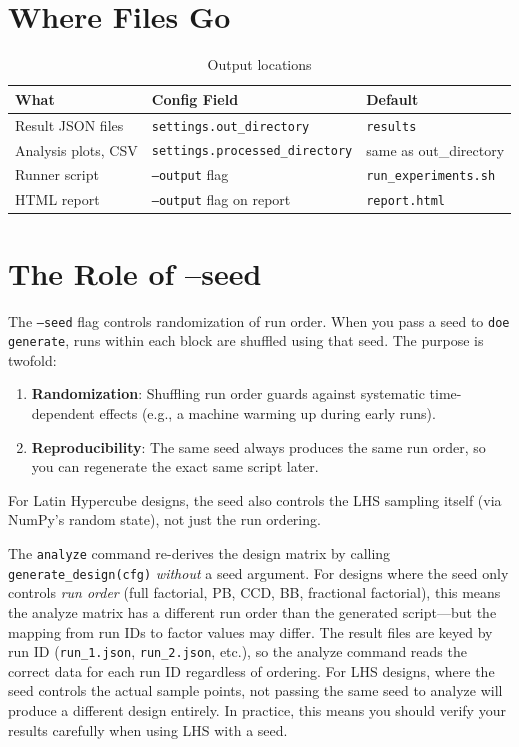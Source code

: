 \documentclass[11pt]{book}
\begin{document}
\section{Where Files Go}

\begin{table}[H]
\centering
\caption{Output locations}
\begin{tabular}{@{}lll@{}}
\toprule
\textbf{What} & \textbf{Config Field} & \textbf{Default} \\
\midrule
Result JSON files & \texttt{settings.out\_directory} & \texttt{results} \\
Analysis plots, CSV & \texttt{settings.processed\_directory} & same as out\_directory \\
Runner script & \texttt{--output} flag & \texttt{run\_experiments.sh} \\
HTML report & \texttt{--output} flag on report & \texttt{report.html} \\
\bottomrule
\end{tabular}
\end{table}

\section{The Role of --seed}

The \texttt{--seed} flag controls randomization of run order. When you pass a seed to \texttt{doe generate}, runs within each block are shuffled using that seed. The purpose is twofold:

\begin{enumerate}
  \item \textbf{Randomization}: Shuffling run order guards against systematic time-dependent effects (e.g., a machine warming up during early runs).
  \item \textbf{Reproducibility}: The same seed always produces the same run order, so you can regenerate the exact same script later.
\end{enumerate}

For Latin Hypercube designs, the seed also controls the LHS sampling itself (via NumPy's random state), not just the run ordering.

\begin{warning}
The \texttt{analyze} command re-derives the design matrix by calling \texttt{generate\_design(cfg)} \emph{without} a seed argument. For designs where the seed only controls \emph{run order} (full factorial, PB, CCD, BB, fractional factorial), this means the analyze matrix has a different run order than the generated script---but the mapping from run IDs to factor values may differ. The result files are keyed by run ID (\texttt{run\_1.json}, \texttt{run\_2.json}, etc.), so the analyze command reads the correct data for each run ID regardless of ordering. For LHS designs, where the seed controls the actual sample points, not passing the same seed to analyze will produce a different design entirely. In practice, this means you should verify your results carefully when using LHS with a seed.
\end{warning}
\end{document}
